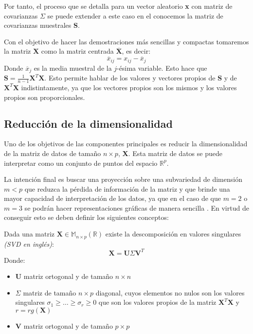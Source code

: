 \noindent Por tanto, el proceso que se detalla para un vector aleatorio \textbf{x} con matriz de covarianzas $\Sigma$ se puede extender a este caso en el conocemos la matriz de covarianzas muestrales \textbf{S}.

\noindent Con el objetivo de hacer las demostraciones más sencillas y compactas tomaremos la matriz $\textbf{X}$ como la matriz centrada $\overline{\textbf{X}}$, es decir: 
\begin{equation}
\overline{x}_{ij}=x_{ij}-\overline{x}_j
\end{equation}
Donde $\overline{x}_j$ es la media muestral de la $j$-ésima variable. Esto hace que $\textbf{S}=\frac{1}{n-1}\textbf{X}^T\textbf{X}$. Esto permite hablar de los valores y vectores propios de \textbf{S} y de $\textbf{X}^T \textbf{X}$ indistintamente, ya que los vectores propios son los mismos y los valores propios son proporcionales. 

\newpage
\subsection{Reducción de la dimensionalidad}

\noindent Uno de los objetivos de las componentes principales es reducir la dimensionalidad de la matriz de datos de tamaño $n\times p$, \textbf{X}. Esta matriz de datos se puede interpretar como un conjunto de puntos del espacio $\mathbb{R}^p$. 

\noindent La intención final es buscar una proyección sobre una subvariedad de dimensión $m<p$ que reduzca la pérdida de información de la matriz y que brinde una mayor capacidad de interpretación de los datos, ya que en el caso de que $m=2$ o $m=3$ se podrán hacer representaciones gráficas de manera sencilla . En virtud de conseguir esto se deben definir los siguientes conceptos:

\begin{defi}
Dada una matriz $\textbf{X}\in  \mathbb{M}_{n\times p}(\mathbb{R})$ existe la descomposición en valores singulares \textit{(SVD en inglés)}:
\begin{equation}
\textbf{X}=\textbf{U}\Sigma\textbf{V}^T
\end{equation}
Donde:
\begin{itemize}
\item \textbf{U} matriz ortogonal y de tamaño $n \times n$
\item $\Sigma$ matriz de tamaño $n \times p $ diagonal, cuyos elementos no nulos son los valores singulares $\sigma_1\geq\ldots\geq \sigma_r\geq 0$ que son los valores propios de la matriz $\textbf{X}^T\textbf{X}$ y $r=rg(\textbf{X})$
\item \textbf{V} matriz ortogonal y de tamaño $p \times p$
\end{itemize}
\end{defi}

